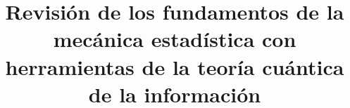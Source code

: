 \documentclass[11pt]{book}
\theoremstyle{definition}
\begin{document}









\title{Revisión de los fundamentos de la mecánica estadística con herramientas de la teoría cuántica de la información} %
\end{document}
